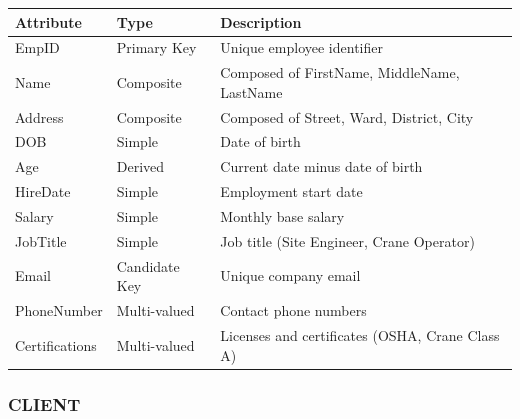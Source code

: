 \documentclass[a4paper,12pt]{report}
\newcounter{none} %
\begin{document}
{\def\LTcaptype{none} %
\begin{longtable}[]{@{}
  >{\raggedright\arraybackslash}p{}
  >{\raggedright\arraybackslash}p{}
  >{\raggedright\arraybackslash}p{}@{}}
\toprule\noalign{}
\begin{minipage}[b]{\linewidth}\raggedright
Attribute
\end{minipage} & \begin{minipage}[b]{\linewidth}\raggedright
Type
\end{minipage} & \begin{minipage}[b]{\linewidth}\raggedright
Description
\end{minipage} \\
\midrule\noalign{}
\endhead
\bottomrule\noalign{}
\endlastfoot
EmpID & Primary Key & Unique employee identifier \\
Name & Composite & Composed of FirstName, MiddleName, LastName \\
Address & Composite & Composed of Street, Ward, District, City \\
DOB & Simple & Date of birth \\
Age & Derived & Current date minus date of birth \\
HireDate & Simple & Employment start date \\
Salary & Simple & Monthly base salary \\
JobTitle & Simple & Job title (\allowbreak{}Site Engineer, Crane Operator) \\
Email & Candidate Key & Unique company email \\
PhoneNumber & Multi-valued & Contact phone numbers \\
Certifications & Multi-valued & Licenses and certificates (\allowbreak{}OSHA, Crane Class A) \\
\end{longtable}
}

\subsubsection{CLIENT}\label{client}
\end{document}
